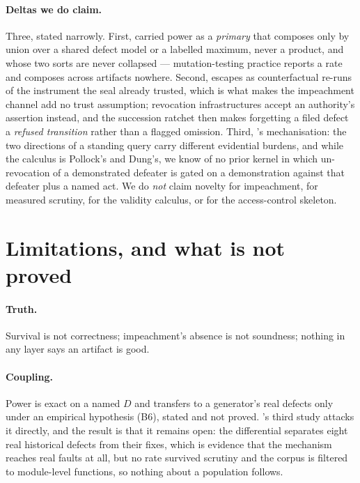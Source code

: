 \documentclass[11pt,a4paper]{article}
\theoremstyle{plain}
\theoremstyle{definition}
\theoremstyle{remark}
\begin{document}
\paragraph{Deltas we do claim.} Three, stated narrowly. First, carried power as a \emph{primary} that composes only by union over a shared defect model or a labelled maximum, never a product, and whose two sorts are never collapsed --- mutation-testing practice reports a rate and composes across artifacts nowhere. Second, escapes as counterfactual re-runs of the instrument the seal already trusted, which is what makes the impeachment channel add no trust assumption; revocation infrastructures accept an authority's assertion instead, and the succession ratchet then makes forgetting a filed defect a \emph{refused transition} rather than a flagged omission. Third, 's mechanisation: the two directions of a standing query carry different evidential burdens, and while the calculus is Pollock's and Dung's, we know of no prior kernel in which un-revocation of a demonstrated defeater is gated on a demonstration against that defeater plus a named act. We do \emph{not} claim novelty for impeachment, for measured scrutiny, for the validity calculus, or for the access-control skeleton.

\section{Limitations, and what is not proved}
\label{sec:limits}

\paragraph{Truth.} Survival is not correctness; impeachment's absence is not soundness; nothing in any layer says an artifact is good.

\paragraph{Coupling.} Power is exact on a named $D$ and transfers to a generator's real defects only under an empirical hypothesis (B6), stated and not proved. 's third study attacks it directly, and the result is that it remains open: the differential separates eight real historical defects from their fixes, which is evidence that the mechanism reaches real faults at all, but no rate survived scrutiny and the corpus is filtered to module-level functions, so nothing about a population follows.
\end{document}

